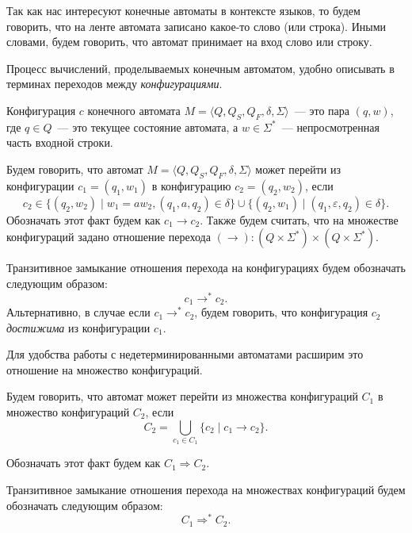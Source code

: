 Так как нас интересуют конечные автоматы в контексте языков, то будем говорить, что на ленте автомата записано какое-то слово (или строка).
Иными словами, будем говорить, что автомат принимает на вход слово или строку.

Процесс вычислений, проделываемых конечным автоматом, удобно описывать в терминах переходов между \emph{конфигурациями}.

\begin{definition}[Конфигурация]
    Конфигурация $c$ конечного автомата $M = \langle Q, Q_S, Q_F, \delta, \Sigma \rangle$~--- это пара $(q, w)$, где $q\in Q$~--- это текущее состояние автомата, а $w \in \Sigma^*$~--- непросмотренная часть входной строки.
\end{definition}

\begin{definition}
    Будем говорить, что автомат $M = \langle Q, Q_S, Q_F, \delta, \Sigma \rangle$ может перейти из конфигурации $c_1 = (q_1, w_1)$ в конфигурацию $c_2 = (q_2, w_2)$, если
    \[c_2 \in \{(q_2,w_2) \mid w_1 = aw_2, (q_1,a, q_2) \in \delta\} \cup \{(q_2,w_1) \mid (q_1, \varepsilon, q_2) \in \delta\}.\]
    Обозначать этот факт будем как $c_1 \to c_2$.
    Также будем считать, что на множестве конфигураций задано отношение перехода $(\to):(Q \times \Sigma^*)\times(Q \times \Sigma^*)$.
    
\end{definition}

\begin{definition}
    Транзитивное замыкание отношения перехода на конфигурациях будем обозначать следующим образом: $$ c_1 \to^* c_2. $$
    Альтернативно, в случае если $c_1 \to^* c_2$, будем говорить, что конфигурация $c_2$ \textit{достижима} из конфигурации $c_1$.
\end{definition}

Для удобства работы с недетерминированными автоматами расширим это отношение на множество конфигураций.

\begin{definition}
Будем говорить, что автомат может перейти из множества конфигураций $C_1$ в множество конфигураций $C_2$, если 
$$C_2 = \bigcup_{c_1 \in C_1} \{c_2 \mid c_1 \to c_2 \}.$$

Обозначать этот факт будем как  $C_1 \Rightarrow C_2 $.
\end{definition}

\begin{definition}
Транзитивное замыкание отношения перехода на множествах конфигураций будем обозначать следующим образом: $$ C_1 \Rightarrow^* C_2. $$
\end{definition}

